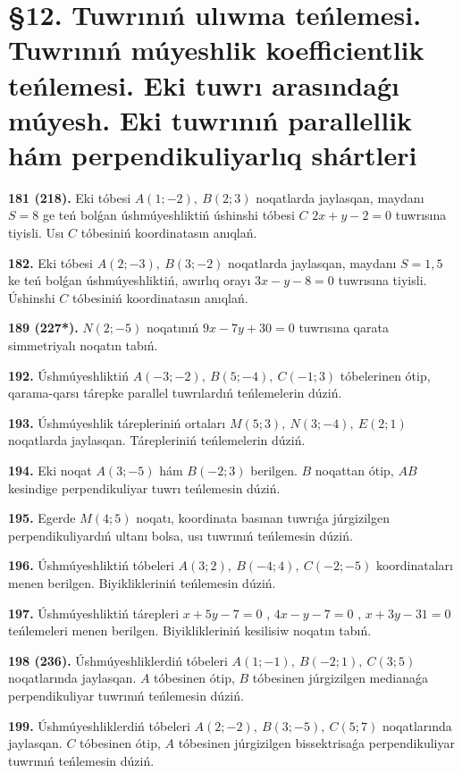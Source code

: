 \documentclass{article}
\begin{document}
\section*{\S 12. Tuwrınıń ulıwma teńlemesi. 
Tuwrınıń múyeshlik koefficientlik teńlemesi. 
Eki tuwrı arasındaǵı múyesh. Eki tuwrınıń parallellik hám 
perpendikuliyarlıq shártleri}

\textbf{181 (218).} Eki tóbesi \(A(1; - 2),\ B(2;3)\) noqatlarda jaylasqan,
maydanı \(S = 8\) ge teń bolǵan úshmúyeshliktiń úshinshi tóbesi
$C$ \(2x + y - 2 = 0\) tuwrısına tiyisli. Usı $C$ tóbesiniń
koordinatasın anıqlań.

\textbf{182.} Eki tóbesi \(A(2; - 3),\ B(3; - 2)\) noqatlarda
jaylasqan, maydanı \(S = 1,5\) ke teń bolǵan úshmúyeshliktiń,
awırlıq orayı \(3x - y - 8 = 0\) tuwrısına tiyisli. Úshinshi $C$
tóbesiniń koordinatasın anıqlań.

\textbf{189 (227*).} \(N(2; - 5)\) noqatınıń \(9x - 7y + 30 = 0\) tuwrısına
qarata simmetriyalı noqatın tabıń.

\textbf{192.} Úshmúyeshliktiń \(A( - 3; - 2),\ B(5; - 4),\ C( - 1;3)\) 
tóbelerinen ótip, qarama-qarsı tárepke parallel tuwrılardıń teńlemelerin
dúziń.

\textbf{193.} Úshmúyeshlik tárepleriniń ortaları
\(M(5;3),\ N(3; - 4),\ E(2;1)\) noqatlarda jaylasqan. Tárepleriniń
teńlemelerin dúziń.

\textbf{194.} Eki noqat \(A(3; - 5)\) hám \(B( - 2;3)\) berilgen.
$B$ noqattan ótip, $AB$ kesindige perpendikuliyar tuwrı
teńlemesin dúziń.

\textbf{195.} Egerde \(M(4;5)\) noqatı, koordinata basınan tuwrıǵa
júrgizilgen perpendikuliyardıń ultanı bolsa, usı tuwrınıń teńlemesin
dúziń.

\textbf{196.} Úshmúyeshliktiń tóbeleri
\(A(3;2),\ B( - 4;4),\ C( - 2; - 5)\) koordinataları menen berilgen.
Biyiklikleriniń teńlemesin dúziń.

\textbf{197.} Úshmúyeshliktiń tárepleri \(x + 5y - 7 = 0\) ,
\(4x - y - 7 = 0\) , \(x + 3y - 31 = 0\) teńlemeleri menen berilgen.
Biyiklikleriniń kesilisiw noqatın tabıń.

\textbf{198 (236).} Úshmúyeshliklerdiń tóbeleri
\(A(1; - 1),\ B( - 2;1),\ C(3;5)\) noqatlarında jaylasqan. $A$
tóbesinen ótip, $B$ tóbesinen júrgizilgen medianaǵa
perpendikuliyar tuwrınıń teńlemesin dúziń.

\textbf{199.} Úshmúyeshliklerdiń tóbeleri
\(A(2; - 2),\ B(3; - 5),\ C(5;7)\) noqatlarında jaylasqan. $C$
tóbesinen ótip, $A$ tóbesinen júrgizilgen bissektrisaǵa
perpendikuliyar tuwrınıń teńlemesin dúziń.
\end{document}
